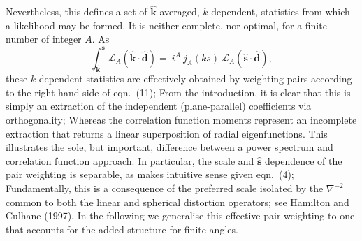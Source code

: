 \documentclass[useAMS,usenatbib]{mn2e}
\begin{document}
Nevertheless, this defines a set of $\boldsymbol{ \hat k}$ averaged, $k$ dependent, statistics from which a likelihood may be formed.  It is neither complete, nor optimal, for a finite number of integer $A$.  As
\begin{equation}
\int_{{\boldsymbol {\hat k}}}^{ \boldsymbol s} \mathcal{L}_A \left(\boldsymbol {\hat k} \cdot \boldsymbol {\hat d} \right) =
\ i^A \ j_A(ks) \ \mathcal{L}_A \left(\boldsymbol {\hat s} \cdot \boldsymbol {\hat d} \right ),
\end{equation}
these $k$ dependent statistics are effectively obtained by weighting pairs according to the right hand side of eqn.~(11);  From the introduction, it is clear that this is simply an extraction of the independent (plane-parallel) coefficients via orthogonality;  Whereas the correlation function moments represent an incomplete extraction that returns a linear superposition of radial eigenfunctions.  This illustrates the sole, but important, difference between a power spectrum and correlation function approach.  In particular, the scale and $\boldsymbol {\hat s}$ dependence of the pair weighting is separable, as makes intuitive sense given eqn.~(4);  Fundamentally, this is a consequence of the preferred scale isolated by the $\nabla^{-2}$ common to both the linear and spherical distortion operators; see Hamilton and Culhane (1997).  In the following we generalise this effective pair weighting to one that accounts for the added structure for finite angles.
\end{document}
